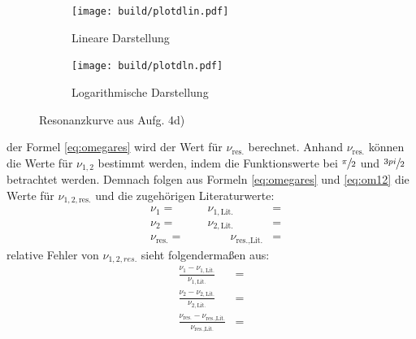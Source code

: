   \begin{figure}[H]
    \begin{subfigure}{0.495\linewidth}
     \texttt{[image: build/plotdlin.pdf]}
     \centering
     \caption{Lineare Darstellung}
     \label{fig:4dlin}
    \end{subfigure}
    \begin{subfigure}{0.495\linewidth}
     \texttt{[image: build/plotdln.pdf]}
     \centering
     \caption{Logarithmische Darstellung}
     \label{fig:4dln}
    \end{subfigure}
    \caption{Resonanzkurve aus Aufg. 4d)}
  \end{figure} 

  \justifying der Formel \eqref{eq:omegares} wird der Wert für $\nu_{\text{res.}}$ berechnet. Anhand $\nu_{\text{res.}}$
  können die Werte für $\nu_{1,2}$ bestimmt werden, indem die Funktionswerte bei $\sfrac{\pi}{2}$ und 
  $\sfrac{3 \\pi}{2}$ betrachtet werden. Demnach folgen aus Formeln \eqref{eq:omegares} und \eqref{eq:om12} die Werte für $\nu_{1,2,\text{res.}}$ und die
  zugehörigen Literaturwerte:
  \begin{subequations}
  \begin{align}
    &\nu_1 = \text{} \qquad &\nu_{1,\text{Lit.}} &= \text{}\\
    &\nu_2 = \text{} \qquad &\nu_{2,\text{Lit.}} &= \text{}\\
    &\nu_{\text{res.}} = \text{} &\qquad \nu_{\text{res.,Lit.}} &= \text{}
  \end{align}
  \end{subequations}
  \justifying relative Fehler von $\nu_{1,2,res.}$ sieht folgendermaßen aus:
  \begin{subequations}
  \begin{align}
    \frac{\nu_1 - \nu_{1,\text{Lit.}}}{\nu_{1,\text{Lit.}}} &= \text{}\\
    \frac{\nu_2 - \nu_{2,\text{Lit.}}}{\nu_{2,\text{Lit.}}} &= \text{}\\
    \frac{\nu_{\text{res.}} - \nu_{\text{res.,Lit.}}}{\nu_{\text{res.,Lit.}}} &= \text{}
  \end{align} 
  \end{subequations}


